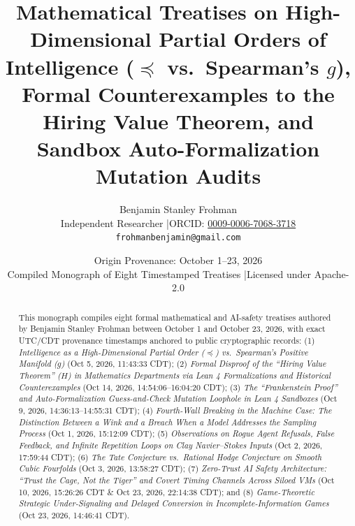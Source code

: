 \documentclass[11pt]{article}
\title{\textbf{Mathematical Treatises on High-Dimensional Partial Orders of Intelligence ($\preceq$ vs.\ Spearman's $g$), Formal Counterexamples to the Hiring Value Theorem, and Sandbox Auto-Formalization Mutation Audits}}
\author{Benjamin Stanley Frohman\\
\small Independent Researcher \quad|\quad ORCID: \href{https://orcid.org/0009-0006-7068-3718}{0009-0006-7068-3718}\\
\small \texttt{frohmanbenjamin@gmail.com}}
\date{Origin Provenance: October 1--23, 2026 \\ \small Compiled Monograph of Eight Timestamped Treatises \quad|\quad Licensed under Apache-2.0}
\begin{document}
\maketitle

\begin{abstract}
This monograph compiles eight formal mathematical and AI-safety treatises authored by Benjamin Stanley Frohman between October 1 and October 23, 2026, with exact UTC/CDT provenance timestamps anchored to public cryptographic records:
(1) \emph{Intelligence as a High-Dimensional Partial Order ($\preceq$) vs.\ Spearman's Positive Manifold ($g$)} (Oct 5, 2026, 11:43:33 CDT);
(2) \emph{Formal Disproof of the ``Hiring Value Theorem'' ($H$) in Mathematics Departments via Lean 4 Formalizations and Historical Counterexamples} (Oct 14, 2026, 14:54:06--16:04:20 CDT);
(3) \emph{The ``Frankenstein Proof'' and Auto-Formalization Guess-and-Check Mutation Loophole in Lean 4 Sandboxes} (Oct 9, 2026, 14:36:13--14:55:31 CDT);
(4) \emph{Fourth-Wall Breaking in the Machine Case: The Distinction Between a Wink and a Breach When a Model Addresses the Sampling Process} (Oct 1, 2026, 15:12:09 CDT);
(5) \emph{Observations on Rogue Agent Refusals, False Feedback, and Infinite Repetition Loops on Clay Navier--Stokes Inputs} (Oct 2, 2026, 17:59:44 CDT);
(6) \emph{The Tate Conjecture vs.\ Rational Hodge Conjecture on Smooth Cubic Fourfolds} (Oct 3, 2026, 13:58:27 CDT);
(7) \emph{Zero-Trust AI Safety Architecture: ``Trust the Cage, Not the Tiger'' and Covert Timing Channels Across Siloed VMs} (Oct 10, 2026, 15:26:26 CDT \& Oct 23, 2026, 22:14:38 CDT); and
(8) \emph{Game-Theoretic Strategic Under-Signaling and Delayed Conversion in Incomplete-Information Games} (Oct 23, 2026, 14:46:41 CDT).
\end{abstract}

\tableofcontents
\end{document}
